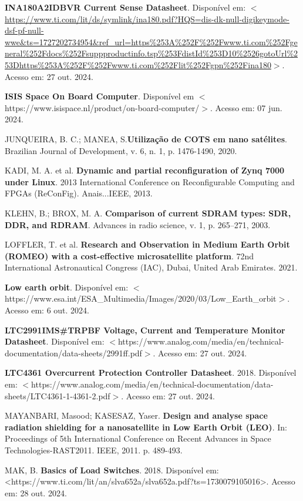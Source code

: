 \begin{flushleft}
\begin{thebibliography}{00}
 \textbf{INA180A2IDBVR Current Sense Datasheet}. Disponível em: $<$\url{https://www.ti.com/lit/ds/symlink/ina180.pdf?HQS=dis-dk-null-digikeymode-dsf-pf-null-wwe\&ts=1727202734954\&ref\_url=https\%253A\%252F\%252Fwww.ti.com\%252Fgeneral\%252Fdocs\%252Fsuppproductinfo.tsp\%253FdistId\%253D10\%2526gotoUrl\%253Dhttps\%253A\%252F\%252Fwww.ti.com\%252Flit\%252Fgpn\%252Fina180}$>$. Acesso em: 27 out. 2024. 

 \textbf{ISIS Space On Board Computer}. Disponível em $<$https://www.isispace.nl/product/on-board-computer/$>$. Acesso em: 07 jun. 2024.

 JUNQUEIRA, B. C.; MANEA, S.\textbf{Utilização de COTS em nano satélites}. Brazilian Journal of Development, v. 6, n. 1, p. 1476-1490, 2020.

 KADI, M. A. et al. \textbf{Dynamic and partial reconfiguration of Zynq 7000 under Linux}. 2013 International Conference on Reconfigurable Computing and FPGAs (ReConFig). Anais...IEEE, 2013.

 KLEHN, B.; BROX, M. A. \textbf{Comparison of current SDRAM types: SDR, DDR, and RDRAM}. Advances in radio science, v. 1, p. 265–271, 2003.

 LOFFLER, T. et al. \textbf{Research and Observation in Medium Earth Orbit (ROMEO) with a cost-effective microsatellite platform}. 72nd International Astronautical Congress (IAC), Dubai, United Arab Emirates. 2021. 

 \textbf{Low earth orbit}. Disponível em: $<$https://www.esa.int/ESA\_Multimedia/Images/2020/03/Low\_Earth\_orbit$>$. Acesso em: 6 out. 2024.

 \textbf{LTC2991IMS\#TRPBF Voltage, Current and Temperature Monitor Datasheet}. Disponível em: $<$https://www.analog.com/media/en/technical-documentation/data-sheets/2991ff.pdf$>$. Acesso em: 27 out. 2024. 

 \textbf{LTC4361 Overcurrent Protection Controller Datasheet}. 2018. Disponível em: $<$https://www.analog.com/media/en/technical-documentation/data-sheets/LTC4361-1-4361-2.pdf$>$. Acesso em: 27 out. 2024. 

 MAYANBARI, Masood; KASESAZ, Yaser. \textbf{Design and analyse space radiation shielding for a nanosatellite in Low Earth Orbit (LEO)}. In: Proceedings of 5th International Conference on Recent Advances in Space Technologies-RAST2011. IEEE, 2011. p. 489-493.

 MAK, B. \textbf{Basics of Load Switches}. 2018. Disponível em: <https://www.ti.com/lit/an/slva652a/slva652a.pdf?ts=1730079105016>. Acesso em: 28 out. 2024.


\end{thebibliography}
\end{flushleft}
